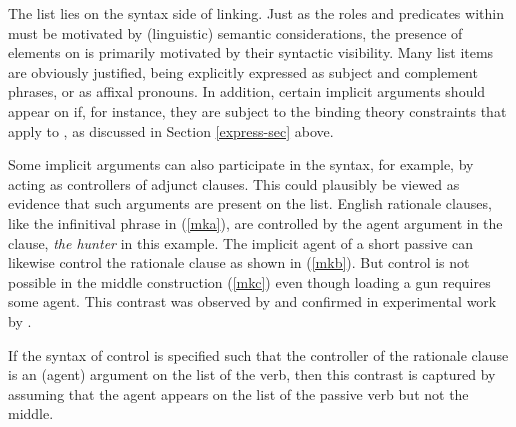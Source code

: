 \documentclass[output=paper
	        ,collection
	        ,collectionchapter
 	        ,biblatex
                ,babelshorthands
                ,newtxmath
                ,draftmode
                ,colorlinks, citecolor=brown
]{langscibook}
\begin{document}
The \argst list lies on the syntax side of linking.  Just as the roles and predicates within \content must be motivated by (linguistic) semantic considerations, the presence of elements on \argst is primarily motivated by their syntactic visibility.  Many \argst list items are obviously justified, being explicitly expressed as subject and complement phrases, or as affixal pronouns.  In addition, certain implicit arguments should appear on \argst if, for instance, they are subject to the binding theory constraints that apply to \argst, as discussed in Section \ref{express-sec} above.

Some implicit arguments can also participate in the syntax, for example, by acting as controllers of adjunct clauses.  This could plausibly be viewed as evidence that such arguments are present on the \argst list.
English rationale clauses, like the infinitival phrase in (\ref{mka}), are controlled  by the agent argument in the clause, \textit{the hunter} in this example.
The implicit agent of a short passive  can likewise control the rationale clause as shown in (\ref{mkb}).
But control is not possible in the middle construction (\ref{mkc}) even though loading a gun requires some agent.
This contrast was observed by \citet{KeyserandRoeper1984} and confirmed in experimental work by \citet{MaunerandKoenig2000}.  

\begin{exe}
\ex\label{mk}
\begin{xlist}
\end{xlist}
\end{exe}



\noindent
If the syntax of control  is specified such that the controller of the rationale clause is an (agent) argument on the \argst list of the verb, then this contrast is captured by assuming that the agent appears on the \argst list of the passive verb but not the middle.
\end{document}
